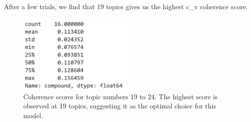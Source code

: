 \documentclass[12pt]{article}
\begin{document}
	After a few trials, we find that 19 topics gives us the highest c\_v coherence score. 
	\begin{figure}[H]
		\centering
		\includegraphics[width=0.5\textwidth]{Q2CV} 
		\caption{\centering Coherence scores for topic numbers 19 to 24. The highest score is observed at 19 topics, suggesting it as the optimal choice for this model.}		
	\end{figure}
	
\end{document}
